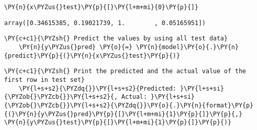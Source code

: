         \begin{tcolorbox}[breakable, size=fbox, boxrule=1pt, pad at break*=1mm,colback=cellbackground, colframe=cellborder]
    \begin{Verbatim}[commandchars=\\\{\}]
    \PY{n}{x\PYZus{}test}\PY{p}{[}\PY{l+m+mi}{0}\PY{p}{]}
    \end{Verbatim}
    \end{tcolorbox}
    
                \begin{tcolorbox}[breakable, size=fbox, boxrule=.5pt, pad at break*=1mm, opacityfill=0]
    \begin{Verbatim}[commandchars=\\\{\}]
    array([0.34615385, 0.19021739, 1.        , 0.05165951])
    \end{Verbatim}
    \end{tcolorbox}
            
        \begin{tcolorbox}[breakable, size=fbox, boxrule=1pt, pad at break*=1mm,colback=cellbackground, colframe=cellborder]
    \begin{Verbatim}[commandchars=\\\{\}]
    \PY{c+c1}{\PYZsh{} Predict the values by using all test data}
    \PY{n}{y\PYZus{}pred} \PY{o}{=} \PY{n}{model}\PY{o}{.}\PY{n}{predict}\PY{p}{(}\PY{n}{x\PYZus{}test}\PY{p}{)}
    \end{Verbatim}
    \end{tcolorbox}
    
        \begin{tcolorbox}[breakable, size=fbox, boxrule=1pt, pad at break*=1mm,colback=cellbackground, colframe=cellborder]
    \begin{Verbatim}[commandchars=\\\{\}]
    \PY{c+c1}{\PYZsh{} Print the predicted and the actual value of the first row in test set}
    \PY{l+s+s2}{\PYZdq{}}\PY{l+s+s2}{Predicted: }\PY{l+s+si}{\PYZob{}\PYZcb{}}\PY{l+s+s2}{, Actual: }\PY{l+s+si}{\PYZob{}\PYZcb{}}\PY{l+s+s2}{\PYZdq{}}\PY{o}{.}\PY{n}{format}\PY{p}{(}\PY{n}{y\PYZus{}pred}\PY{p}{[}\PY{l+m+mi}{1}\PY{p}{]}\PY{p}{,} \PY{n}{y\PYZus{}test}\PY{p}{[}\PY{l+m+mi}{1}\PY{p}{]}\PY{p}{)}
    \end{Verbatim}
    \end{tcolorbox}
    
